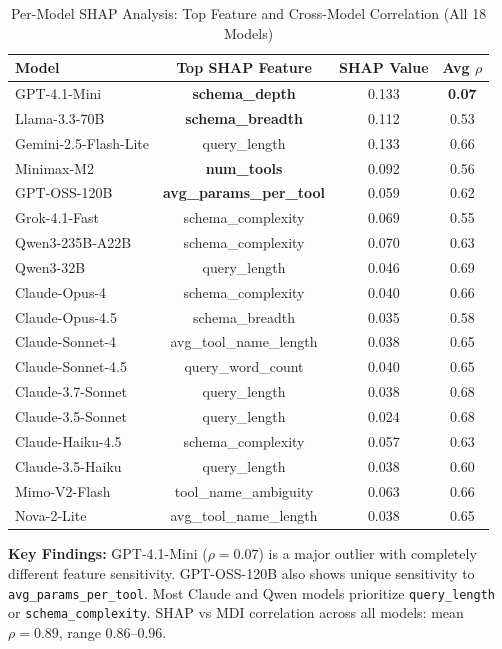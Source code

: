 \documentclass[sigconf,anonymous,review]{acmart}
\begin{document}
\begin{table}[h]
\centering
\caption{Per-Model SHAP Analysis: Top Feature and Cross-Model Correlation (All 18 Models)}
\label{tab:permodel_shap}
\small
\begin{tabular}{@{}lccc@{}}
\toprule
\textbf{Model} & \textbf{Top SHAP Feature} & \textbf{SHAP Value} & \textbf{Avg $\rho$} \\
\midrule
GPT-4.1-Mini & \textbf{schema\_depth} & 0.133 & \textbf{0.07} \\
Llama-3.3-70B & \textbf{schema\_breadth} & 0.112 & 0.53 \\
Gemini-2.5-Flash-Lite & query\_length & 0.133 & 0.66 \\
Minimax-M2 & \textbf{num\_tools} & 0.092 & 0.56 \\
GPT-OSS-120B & \textbf{avg\_params\_per\_tool} & 0.059 & 0.62 \\
Grok-4.1-Fast & schema\_complexity & 0.069 & 0.55 \\
Qwen3-235B-A22B & schema\_complexity & 0.070 & 0.63 \\
Qwen3-32B & query\_length & 0.046 & 0.69 \\
Claude-Opus-4 & schema\_complexity & 0.040 & 0.66 \\
Claude-Opus-4.5 & schema\_breadth & 0.035 & 0.58 \\
Claude-Sonnet-4 & avg\_tool\_name\_length & 0.038 & 0.65 \\
Claude-Sonnet-4.5 & query\_word\_count & 0.040 & 0.65 \\
Claude-3.7-Sonnet & query\_length & 0.038 & 0.68 \\
Claude-3.5-Sonnet & query\_length & 0.024 & 0.68 \\
Claude-Haiku-4.5 & schema\_complexity & 0.057 & 0.63 \\
Claude-3.5-Haiku & query\_length & 0.038 & 0.60 \\
Mimo-V2-Flash & tool\_name\_ambiguity & 0.063 & 0.66 \\
Nova-2-Lite & avg\_tool\_name\_length & 0.038 & 0.65 \\
\bottomrule
\end{tabular}
\end{table}

\textbf{Key Findings:} GPT-4.1-Mini ($\rho=0.07$) is a major outlier with completely different feature sensitivity. GPT-OSS-120B also shows unique sensitivity to \texttt{avg\_params\_per\_tool}. Most Claude and Qwen models prioritize \texttt{query\_length} or \texttt{schema\_complexity}. SHAP vs MDI correlation across all models: mean $\rho=0.89$, range 0.86--0.96.
\end{document}
